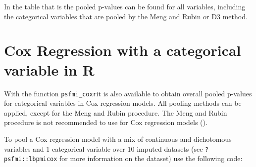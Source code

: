 \documentclass[
]{book}
\newenvironment{Shaded}{\begin{snugshade}}{\end{snugshade}}
\newcommand{\AttributeTok}[1]{\textcolor[rgb]{0.77,0.63,0.00}{#1}}
\newcommand{\DecValTok}[1]{\textcolor[rgb]{0.00,0.00,0.81}{#1}}
\newcommand{\FunctionTok}[1]{\textcolor[rgb]{0.00,0.00,0.00}{#1}}
\newcommand{\NormalTok}[1]{#1}
\newcommand{\OtherTok}[1]{\textcolor[rgb]{0.56,0.35,0.01}{#1}}
\newcommand{\SpecialCharTok}[1]{\textcolor[rgb]{0.00,0.00,0.00}{#1}}
\newcommand{\StringTok}[1]{\textcolor[rgb]{0.31,0.60,0.02}{#1}}
\begin{document}
In the table that is the pooled p-values can be found for all variables, including the categorical variables that are pooled by the Meng and Rubin or D3 method.

\hypertarget{cox-regression-with-a-categorical-variable-in-r}{%
\section{Cox Regression with a categorical variable in R}\label{cox-regression-with-a-categorical-variable-in-r}}

With the function \texttt{psfmi\_coxr}it is also available to obtain overall pooled p-values for categorical variables in Cox regression models. All pooling methods can be applied, except for the Meng and Rubin procedure. The Meng and Rubin procedure is not recommended to use for Cox regression models (\citet{Marshall2009MedResMeth}).

To pool a Cox regression model with a mix of continuous and dichotomous variables and 1 categorical variable over 10 imputed datasets (see \texttt{?psfmi::lbpmicox} for more information on the dataset) use the following code:

\begin{Shaded}
\end{Shaded}
\end{document}

